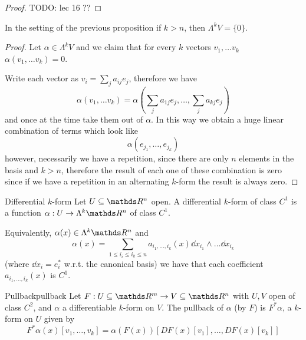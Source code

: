 \documentclass[12pt]{extarticle}
\begin{document}
\begin{proof}
	TODO: lec 16 ??
\end{proof}

\begin{lemma}{}{}
	In the setting of the previous proposition if $k > n$, then $\Lambda^k V = \{ 0 \}$.
\end{lemma}
\begin{proof}
	Let $\alpha \in \Lambda^k V$ and we claim that for every $k$ vectors $v_1, \dots v_k$
	$\alpha(v_1, \dots v_k) = 0$.

	Write each vector as $v_i = \sum_j a_{ij} e_j$, therefore we have
	\begin{equation}
		\alpha(v_1, \dots v_k) = \alpha\left(\sum_j a_{1j} e_j, \dots, \sum_j a_{kj} e_j \right)
	\end{equation}
	and once at the time take them out of $\alpha$. In this way we obtain a huge linear combination of
	terms which look like
	\begin{equation}
		\alpha(e_{j_1}, \dots, e_{j_k})
	\end{equation}
	however, necessarily we have a repetition, since there are only $n$ elements in the basis and
	$k > n$, therefore the result of each one of these combination is zero since if we have a
	repetition in an alternating $k$-form the result is always zero.
\end{proof}

\begin{definition}{Differential $k$-form}{}
	Let $U \subseteq \R^n$ open. A differential $k$-form of class $C^1$ is a function
	$\alpha: U \to \Lambda^k \R^n$ of class $C^1$.

	Equivalently, $\alpha(x) \in \Lambda^k \R^n$ and
	\begin{equation}
		\alpha(x) = \sum_{1 \leq i_i \leq i_k \leq n} a_{i_1, \dots, i_k}(x)
		\dd x_{i_1} \land \dots \dd x_{i_k}
	\end{equation}
	(where $\dd x_i = e_i^*$ w.r.t. the canonical basis) we have that each coefficient
	$a_{i_1, \dots, i_k}(x)$ is $C^1$.
\end{definition}

\begin{definition}{Pullback}{pullback}
	Let $F: U \subseteq \R^m \to V \subseteq \R^n$ with $U, V$ open of class $C^2$,
	and $\alpha$ a differentiable $k$-form on $V$.
	The pullback of $\alpha$ (by $F$) is $F^* \alpha$, a $k$-form on $U$ given by
	\begin{equation}
		F^* \alpha (x) [v_1, \dots, v_k] = \alpha(F(x))[DF(x)[v_1], \dots, DF(x)[v_k]]
	\end{equation}
\end{definition}
\end{document}

